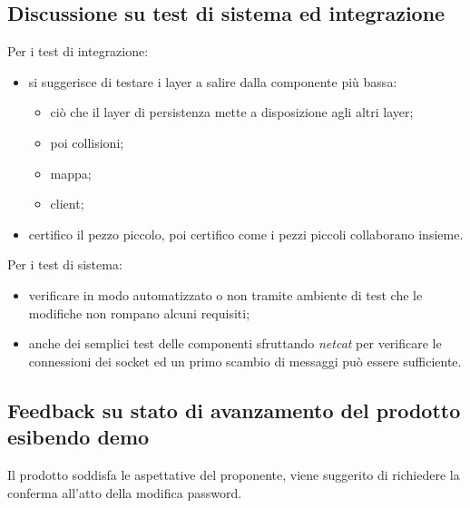 \subsection{Discussione su test di sistema ed integrazione}
    Per i test di integrazione:
    \begin{itemize}
        \item si suggerisce di testare i layer a salire dalla componente più bassa:
        \begin{itemize}
            \item ciò che il layer di persistenza mette a disposizione agli altri layer;

            \item poi collisioni;

            \item mappa;

            \item client;

        \end{itemize}
        \item certifico il pezzo piccolo, poi certifico come i pezzi piccoli collaborano insieme.
    \end{itemize}


    Per i test di sistema:
    \begin{itemize}
        \item verificare in modo automatizzato o non tramite ambiente di test che le modifiche non rompano alcuni requisiti;

        \item anche dei semplici test delle componenti sfruttando \textit{netcat} per verificare le connessioni dei socket ed un primo scambio di messaggi può essere sufficiente.
    \end{itemize}

\subsection{Feedback su stato di avanzamento del prodotto esibendo demo}
    Il prodotto soddisfa le aspettative del proponente, viene suggerito di richiedere la conferma all'atto della modifica password.

